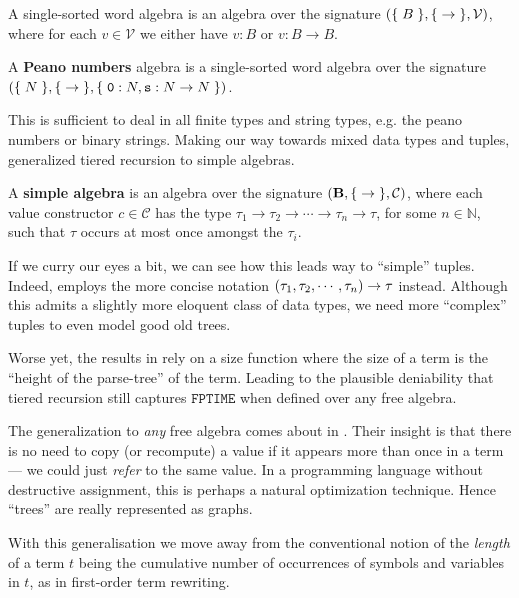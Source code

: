 \begin{example} A single-sorted word algebra is an algebra over the signature
${\mathopen{}\left({\mathopen{}\left\{\mathrel{}{B}\mathrel{}\right\}\mathclose{},\mathopen{}\left\{\mathrel{}{\rightarrow}\mathrel{}\right\}\mathclose{}, \mathcal{V}}\right)\mathclose{}}$, where for each $v \in
\mathcal{V}$ we either have $v : B$ or $v : B\rightarrow B$. \end{example}

\begin{definition} A \textbf{Peano numbers} algebra is a single-sorted word
algebra over the signature ${\mathopen{}\left({\mathopen{}\left\{\mathrel{}{N}\mathrel{}\right\}\mathclose{}, \mathopen{}\left\{\mathrel{}{\rightarrow}\mathrel{}\right\}\mathclose{},\mathopen{}\left\{\mathrel{}{\mathtt{0} : N,
\mathtt{s} : N \rightarrow N}\mathrel{}\right\}\mathclose{}}\right)\mathclose{}}$. \end{definition}


This is sufficient to deal in all finite types and string types, e.g.  the
peano numbers or binary strings. Making our way towards mixed data types and
tuples, \cite{marion-2003} generalized tiered recursion to simple algebras.
 
\begin{definition} A \textbf{simple algebra} is an algebra over the signature
${\mathopen{}\left({\mathbf{B}, \mathopen{}\left\{\mathrel{}{\rightarrow}\mathrel{}\right\}\mathclose{}, \mathcal{C}}\right)\mathclose{}}$, where each value constructor
$c \in \mathcal{C}$ has the type $\tau_1 \rightarrow \tau_2 \rightarrow \cdots
\rightarrow \tau_n \rightarrow \tau$, for some $n\in \mathbb{N}$, such that
$\tau$ occurs at most once amongst the $\tau_i$.  \end{definition}

If we curry our eyes a bit, we can see how this leads way to ``simple'' tuples.
Indeed, \cite{marion-2003} employs the more concise notation
${\mathopen{}\left({\tau_1,\tau_2,\cdots,\tau_n}\right)\mathclose{}}\rightarrow \tau$ instead.  Although this
admits a slightly more eloquent class of data types, we need more ``complex''
tuples to even model good old trees.

Worse yet, the results in \cite{leivant-1995} rely on a size function where the
size of a term is the ``height of the parse-tree'' of the term. Leading to the
plausible deniability that tiered recursion still captures $\mathtt{FPTIME}$
when defined over any free algebra\cite{caseiro-1996}.

The generalization to \emph{any} free algebra comes about in
\cite{dal-lago-et-al-2010}. Their insight is that there is no need to copy (or
recompute) a value if it appears more than once in a term --- we could just
\emph{refer} to the same value. In a programming language without destructive
assignment, this is perhaps a natural optimization technique. Hence ``trees''
are really represented as graphs.

\begin{remark} With this generalisation we move away from the conventional
notion of the \emph{length} of a term $t$ being the cumulative number of
occurrences of symbols and variables in $t$, as in first-order term
rewriting\cite{klop-vrijer-2003}. \end{remark}


